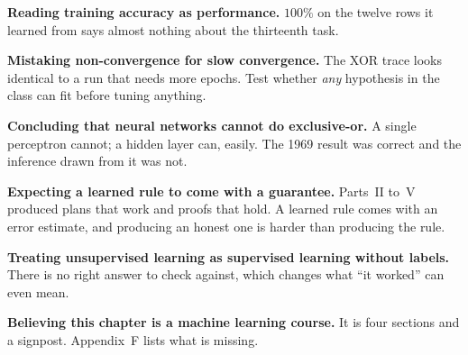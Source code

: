 \begin{pitfall}
\begin{tight}
  \item \textbf{Reading training accuracy as performance.} $100\%$ on the twelve
        rows it learned from says almost nothing about the thirteenth task.
  \item \textbf{Mistaking non-convergence for slow convergence.} The XOR trace looks
        identical to a run that needs more epochs. Test whether \emph{any}
        hypothesis in the class can fit before tuning anything.
  \item \textbf{Concluding that neural networks cannot do exclusive-or.} A single
        perceptron cannot; a hidden layer can, easily. The 1969 result was correct
        and the inference drawn from it was not.
  \item \textbf{Expecting a learned rule to come with a guarantee.} Parts~II to~V
        produced plans that work and proofs that hold. A learned rule comes with an
        error estimate, and producing an honest one is harder than producing the
        rule.
  \item \textbf{Treating unsupervised learning as supervised learning without
        labels.} There is no right answer to check against, which changes what
        ``it worked'' can even mean.
  \item \textbf{Believing this chapter is a machine learning course.} It is four
        sections and a signpost. Appendix~F lists what is missing.
\end{tight}
\end{pitfall}

